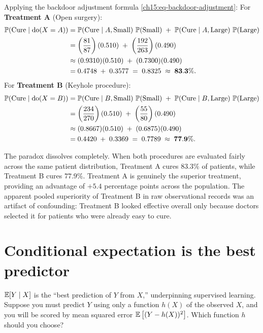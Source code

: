 Applying the backdoor adjustment formula \eqref{ch15:eq-backdoor-adjustment}:
For \textbf{Treatment A} (Open surgery):
\[
\begin{aligned}
  \operatorname{\mathbb{P}}(\text{Cure} \mid \operatorname{do}(X = A))
  &= \operatorname{\mathbb{P}}(\text{Cure} \mid A, \text{Small})\,\operatorname{\mathbb{P}}(\text{Small}) \;+\; \operatorname{\mathbb{P}}(\text{Cure} \mid A, \text{Large})\,\operatorname{\mathbb{P}}(\text{Large}) \\
  &= \left(\frac{81}{87}\right)(0.510) \;+\; \left(\frac{192}{263}\right)(0.490) \\
  &\approx (0.9310)(0.510) \;+\; (0.7300)(0.490) \\
  &= 0.4748 \;+\; 0.3577 \;=\; 0.8325 \;\approx\; \mathbf{83.3\%}.
\end{aligned}
\]
For \textbf{Treatment B} (Keyhole procedure):
\[
\begin{aligned}
  \operatorname{\mathbb{P}}(\text{Cure} \mid \operatorname{do}(X = B))
  &= \operatorname{\mathbb{P}}(\text{Cure} \mid B, \text{Small})\,\operatorname{\mathbb{P}}(\text{Small}) \;+\; \operatorname{\mathbb{P}}(\text{Cure} \mid B, \text{Large})\,\operatorname{\mathbb{P}}(\text{Large}) \\
  &= \left(\frac{234}{270}\right)(0.510) \;+\; \left(\frac{55}{80}\right)(0.490) \\
  &\approx (0.8667)(0.510) \;+\; (0.6875)(0.490) \\
  &= 0.4420 \;+\; 0.3369 \;=\; 0.7789 \;\approx\; \mathbf{77.9\%}.
\end{aligned}
\]

The paradox dissolves completely. When both procedures are evaluated fairly across the same patient distribution, Treatment A cures $83.3\%$ of patients, while Treatment B cures $77.9\%$. Treatment A is genuinely the superior treatment, providing an advantage of $+5.4$ percentage points across the population. The apparent pooled superiority of Treatment B in raw observational records was an artifact of confounding: Treatment B looked effective overall only because doctors selected it for patients who were already easy to cure.

\section{Conditional expectation is the best predictor}
\label{ch15:best-predictor}

$\operatorname{\mathbb{E}}[Y\mid X]$ is the ``best prediction of $Y$ from $X$,'' underpinning supervised learning.
Suppose you must predict $Y$ using only a function
$h(X)$ of the observed $X$, and you will be scored by mean squared error $\operatorname{\mathbb{E}}\big[(Y - h(X))^2\big]$.
Which function $h$ should you choose?

